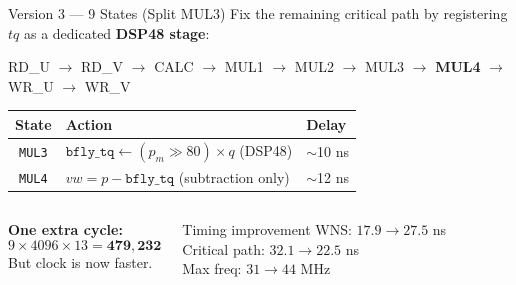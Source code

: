 \documentclass[aspectratio=169, 11pt]{beamer}
\begin{document}
\begin{frame}{Version 3 --- 9 States (Split MUL3)}
Fix the remaining critical path by registering $tq$ as a dedicated \textbf{DSP48 stage}:

\vspace{0.3em}
\begin{center}
\ttfamily\small
RD\_U $\to$ RD\_V $\to$ CALC $\to$ MUL1 $\to$ MUL2 $\to$ MUL3 $\to$ \textbf{MUL4} $\to$ WR\_U $\to$ WR\_V
\end{center}

\vspace{0.3em}
\begin{center}
\small
\begin{tabular}{cll}
\toprule
\textbf{State} & \textbf{Action} & \textbf{Delay} \\
\midrule
\texttt{MUL3} & $\texttt{bfly\_tq} \leftarrow (p_m \gg 80) \times q$ \quad (DSP48) & $\sim$10 ns \\
\texttt{MUL4} & $vw = p - \texttt{bfly\_tq}$ \quad (subtraction only) & $\sim$12 ns \\
\bottomrule
\end{tabular}
\end{center}

\vspace{0.3em}
\begin{columns}
\textbf{One extra cycle:}
\[9 \times 4096 \times 13 = \mathbf{479{,}232}\]
But clock is now faster.

\begin{block}{Timing improvement}
\centering
WNS: $17.9 \to 27.5$ ns\\
Critical path: $32.1 \to 22.5$ ns\\
Max freq: $31 \to 44$ MHz
\end{block}
\end{columns}
\end{frame}
\end{document}
